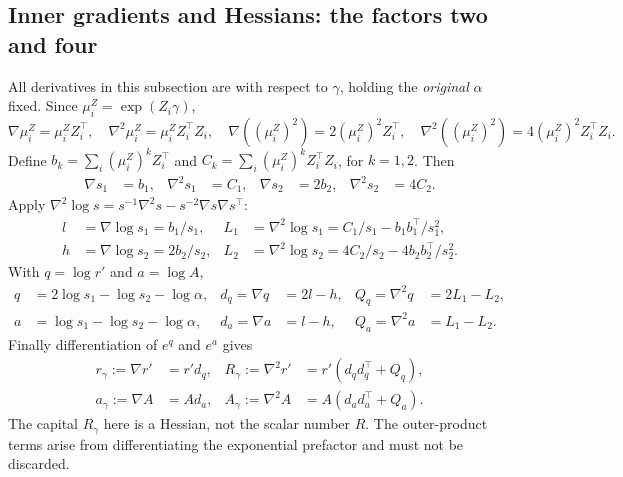 \documentclass[11pt,a4paper]{article}
\numberwithin{equation}{section}
\begin{document}
\subsection{Inner gradients and Hessians: the factors two and four}
All derivatives in this subsection are with respect to $\gamma$,
holding the \emph{original} $\alpha$ fixed.
Since $\mu_i^Z=\exp({Z_i}\gamma)$,
\begin{equation}
 \nabla \mu_i^Z=\mu_i^Z{Z_i^\top},\quad \nabla^2\mu_i^Z=\mu_i^Z{Z_i^\top}{Z_i},\quad
 \nabla((\mu_i^Z)^2)=2(\mu_i^Z)^2{Z_i^\top},\quad \nabla^2((\mu_i^Z)^2)=4(\mu_i^Z)^2{Z_i^\top}{Z_i}.
\end{equation}
Define $b_k=\sum_i(\mu_i^Z)^k{Z_i^\top}$ and $C_k=\sum_i(\mu_i^Z)^k{Z_i^\top}{Z_i}$,
for $k=1,2$. Then
\begin{align}
 \nabla s_1&=b_1,&\nabla^2s_1&=C_1,&
 \nabla s_2&=2b_2,&\nabla^2s_2&=4C_2 .
\end{align}
Apply $\nabla^2\log s=s^{-1}\nabla^2s-s^{-2}\nabla s\nabla s^\top$:
\begin{align}
 l&=\nabla\log s_1=b_1/s_1,&
 L_1&=\nabla^2\log s_1=C_1/s_1-b_1b_1^\top/s_1^2,\\
 h&=\nabla\log s_2=2b_2/s_2,&
 L_2&=\nabla^2\log s_2=4C_2/s_2-4b_2b_2^\top/s_2^2 .
\end{align}
With $q=\log{r'}$ and $a=\log A$,
\begin{align}
 q&=2\log s_1-\log s_2-\log\alpha,&
 d_q=\nabla q&=2l-h,&Q_q=\nabla^2q&=2L_1-L_2,\\
 a&=\log s_1-\log s_2-\log\alpha,&
 d_a=\nabla a&=l-h,&Q_a=\nabla^2a&=L_1-L_2 .
 \label{eq:log-inner}
\end{align}
Finally differentiation of $e^q$ and $e^a$ gives
\begin{align}
 r_\gamma:=\nabla{r'}&={r'} d_q,&
 R_\gamma:=\nabla^2{r'}&={r'}(d_qd_q^\top+Q_q),\\
 a_\gamma:=\nabla A&=A d_a,&
 A_\gamma:=\nabla^2A&=A(d_ad_a^\top+Q_a).
 \label{eq:inner}
\end{align}
The capital $R_\gamma$ here is a Hessian, not the scalar number $R$.
The outer-product terms arise from differentiating the exponential
prefactor and must not be discarded.
\end{document}
